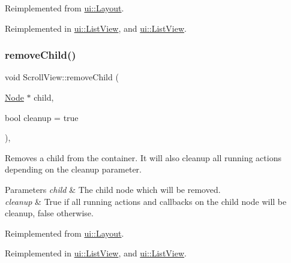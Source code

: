 Reimplemented from \hyperlink{classui_1_1Layout_a7c317fa2fc294158776962b9218304b9}{ui\+::\+Layout}.



Reimplemented in \hyperlink{classui_1_1ListView_a04bcc9bd8c55dea8f034a8380b3ab3a8}{ui\+::\+List\+View}, and \hyperlink{classui_1_1ListView_a01691c095058bc86f372e6439b15b151}{ui\+::\+List\+View}.

\mbox{\label{classui_1_1ScrollView_a678108e716966e8beccc25c0de1d9b29}} 
\subsubsection{\texorpdfstring{remove\+Child()}{removeChild()}\hspace{0.1cm}{\footnotesize\ttfamily [1/2]}}
{\footnotesize\ttfamily void Scroll\+View\+::remove\+Child (\begin{DoxyParamCaption}\item[{\hyperlink{classNode}{Node} $\ast$}]{child,  }\item[{bool}]{cleanup = {\ttfamily true} }\end{DoxyParamCaption})\hspace{0.3cm}{\ttfamily [override]}, {\ttfamily [virtual]}}

Removes a child from the container. It will also cleanup all running actions depending on the cleanup parameter.


\begin{DoxyParams}{Parameters}
{\em child} & The child node which will be removed. \\
\hline
{\em cleanup} & True if all running actions and callbacks on the child node will be cleanup, false otherwise. \\
\hline
\end{DoxyParams}


Reimplemented from \hyperlink{classui_1_1Layout_a13d675c669b6b926956baf484ce0857a}{ui\+::\+Layout}.



Reimplemented in \hyperlink{classui_1_1ListView_ace4890246e03a8de66cfe9d0312df365}{ui\+::\+List\+View}, and \hyperlink{classui_1_1ListView_a7002fe4ad783aeccf56cebbe4144036e}{ui\+::\+List\+View}.

\mbox{\label{classui_1_1ScrollView_ae3b50790cd7fa0feeacc9204fe86fc1a}} 
